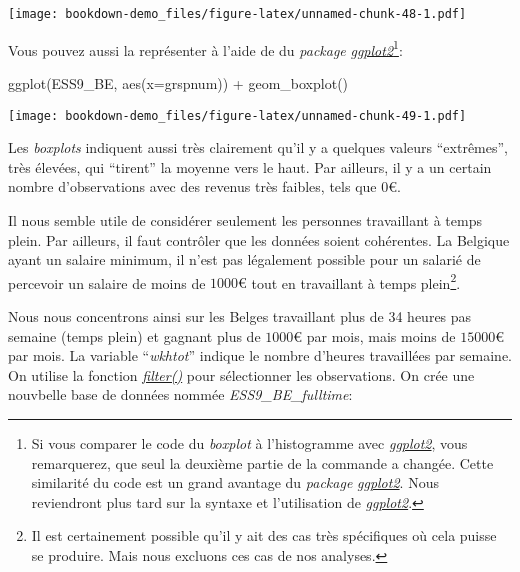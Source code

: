 \documentclass[
]{book}
\newenvironment{Shaded}{\begin{snugshade}}{\end{snugshade}}
\newcommand{\AttributeTok}[1]{\textcolor[rgb]{0.77,0.63,0.00}{#1}}
\newcommand{\FunctionTok}[1]{\textcolor[rgb]{0.00,0.00,0.00}{#1}}
\newcommand{\NormalTok}[1]{#1}
\newcommand{\SpecialCharTok}[1]{\textcolor[rgb]{0.00,0.00,0.00}{#1}}
\begin{document}
\texttt{[image: bookdown-demo\_files/figure-latex/unnamed-chunk-48-1.pdf]}

Vous pouvez aussi la représenter à l'aide de du \emph{package} \href{https://ggplot2.tidyverse.org/}{\emph{ggplot2}}\footnote{Si vous comparer le code du \emph{boxplot} à l'histogramme avec \href{https://ggplot2.tidyverse.org/}{\emph{ggplot2}}, vous remarquerez, que seul la deuxième partie de la commande a changée. Cette similarité du code est un grand avantage du \emph{package} \href{https://ggplot2.tidyverse.org/}{\emph{ggplot2}}. Nous reviendront plus tard sur la syntaxe et l'utilisation de \href{https://ggplot2.tidyverse.org/}{\emph{ggplot2}}.}:

\begin{Shaded}
\begin{Highlighting}[]
\FunctionTok{ggplot}\NormalTok{(ESS9\_BE, }\FunctionTok{aes}\NormalTok{(}\AttributeTok{x=}\NormalTok{grspnum)) }\SpecialCharTok{+}
  \FunctionTok{geom\_boxplot}\NormalTok{()}
\end{Highlighting}
\end{Shaded}

\texttt{[image: bookdown-demo\_files/figure-latex/unnamed-chunk-49-1.pdf]}

Les \emph{boxplots} indiquent aussi très clairement qu'il y a quelques valeurs ``extrêmes'', très élevées, qui ``tirent'' la moyenne vers le haut. Par ailleurs, il y a un certain nombre d'observations avec des revenus très faibles, tels que \(0€\).

Il nous semble utile de considérer seulement les personnes travaillant à temps plein. Par ailleurs, il faut contrôler que les données soient cohérentes. La Belgique ayant un salaire minimum, il n'est pas légalement possible pour un salarié de percevoir un salaire de moins de \(1000€\) tout en travaillant à temps plein\footnote{Il est certainement possible qu'il y ait des cas très spécifiques où cela puisse se produire. Mais nous excluons ces cas de nos analyses.}.

Nous nous concentrons ainsi sur les Belges travaillant plus de 34 heures pas semaine (temps plein) et gagnant plus de \(1000€\) par mois, mais moins de \(15000€\) par mois. La variable ``\emph{wkhtot}'' indique le nombre d'heures travaillées par semaine. On utilise la fonction \href{https://dplyr.tidyverse.org/reference/filter.html}{\emph{filter()}} pour sélectionner les observations. On crée une nouvbelle base de données nommée \emph{ESS9\_BE\_fulltime}:
\end{document}

